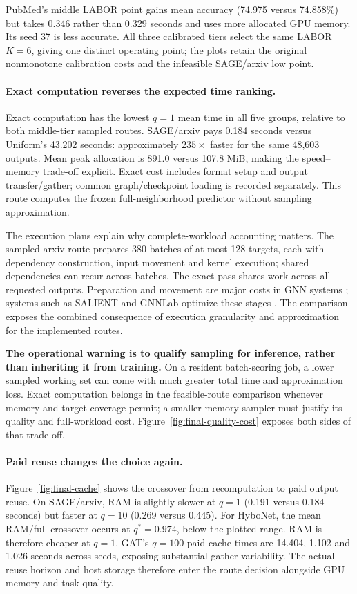 \documentclass[sigconf, nonacm]{acmart}
\begin{document}

\FinalQualityCostFigure

PubMed's middle LABOR point gains mean accuracy (74.975 versus 74.858\%) but takes 0.346 rather than 0.329 seconds and uses more allocated GPU memory. Its seed 37 is less accurate. All three calibrated tiers select the same LABOR $K=6$, giving one distinct operating point; the plots retain the original nonmonotone calibration costs and the infeasible SAGE/arxiv low point.

\paragraph{Exact computation reverses the expected time ranking.}
Exact computation has the lowest $q=1$ mean time in all five groups, relative to both middle-tier sampled routes. SAGE/arxiv pays 0.184 seconds versus Uniform's 43.202 seconds: approximately $235\times$ faster for the same 48,603 outputs. Mean peak allocation is 891.0 versus 107.8 MiB, making the speed--memory trade-off explicit. Exact cost includes format setup and output transfer/gather; common graph/checkpoint loading is recorded separately. This route computes the frozen full-neighborhood predictor without sampling approximation.

The execution plans explain why complete-workload accounting matters. The sampled arxiv route prepares 380 batches of at most 128 targets, each with dependency construction, input movement and kernel execution; shared dependencies can recur across batches. The exact pass shares work across all requested outputs. Preparation and movement are major costs in GNN systems \cite{yuan2024comprehensive,liu2023bgl,dgl2024graphbolt}; systems such as SALIENT and GNNLab optimize these stages \cite{kaler2022salient,yang2022gnnlab}. The comparison exposes the combined consequence of execution granularity and approximation for the implemented routes.

\textbf{The operational warning is to qualify sampling for inference, rather than inheriting it from training.} On a resident batch-scoring job, a lower sampled working set can come with much greater total time and approximation loss. Exact computation belongs in the feasible-route comparison whenever memory and target coverage permit; a smaller-memory sampler must justify its quality and full-workload cost. Figure~\ref{fig:final-quality-cost} exposes both sides of that trade-off.

\paragraph{Paid reuse changes the choice again.}
Figure~\ref{fig:final-cache} shows the crossover from recomputation to paid output reuse. On SAGE/arxiv, RAM is slightly slower at $q=1$ (0.191 versus 0.184 seconds) but faster at $q=10$ (0.269 versus 0.445). For HyboNet, the mean RAM/full crossover occurs at $q^*=0.974$, below the plotted range. RAM is therefore cheaper at $q=1$. GAT's $q=100$ paid-cache times are 14.404, 1.102 and 1.026 seconds across seeds, exposing substantial gather variability. The actual reuse horizon and host storage therefore enter the route decision alongside GPU memory and task quality.
\end{document}
